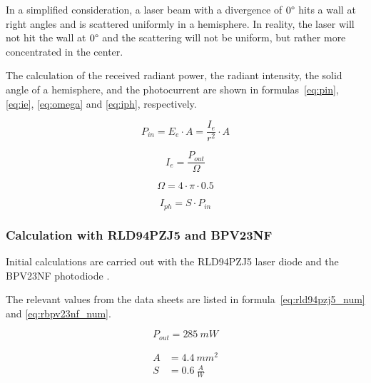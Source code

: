 In a simplified consideration, a laser beam with a divergence of $0\degree$ hits a wall at right angles
and is scattered uniformly in a hemisphere. In reality, the laser will not hit the wall at $0\degree$ and
the scattering will not be uniform, but rather more concentrated in the center.

The calculation of the received radiant power, the radiant intensity, the solid angle of a hemisphere, and the
photocurrent are shown in formulas~\ref{eq:pin}, \ref{eq:ie}, \ref{eq:omega} and \ref{eq:iph}, respectively.

\begin{equation}\label{eq:pin}
    P_{in} = E_e \cdot A = \frac{I_e}{r^2} \cdot A
\end{equation}

\begin{equation}\label{eq:ie}
    I_e = \frac{P_{out}}{\Omega}
\end{equation}

\begin{equation}\label{eq:omega}
    \Omega = 4\cdot \pi \cdot 0.5
\end{equation}

\begin{equation}\label{eq:iph}
    I_{ph} = S \cdot P_{in}
\end{equation}

\subsubsection{Calculation with RLD94PZJ5 and BPV23NF}

Initial calculations are carried out with the RLD94PZJ5 laser diode \cite{rohm2020rld94pzj5_datasheet} and the BPV23NF photodiode
\cite{vishay2024bpv23nf_datasheet}.

The relevant values from the data sheets are listed in formula~\ref{eq:rld94pzj5_num} and \ref{eq:rbpv23nf_num}.

\begin{equation}\label{eq:rld94pzj5_num}
    P_{out} = 285~mW
\end{equation}

\begin{equation}\label{eq:rbpv23nf_num}
    \begin{split}
        A & = 4.4~mm^2        \\
        S & = 0.6~\frac{A}{W}
    \end{split}
\end{equation}

